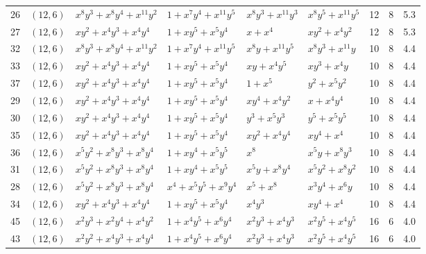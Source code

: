 \begin{table}[t]
\begin{tabular*}{\textwidth}{@{\extracolsep{\fill}}cllllllcc}
26 & $(12,6)$ & $x^{8}y^{3}{+}x^{8}y^{4}{+}x^{11}y^{2}$ & $1{+}x^{7}y^{4}{+}x^{11}y^{5}$ & $x^{8}y^{3}{+}x^{11}y^{3}$ & $x^{8}y^{5}{+}x^{11}y^{5}$ & 12 & 8 & 5.3 \\
27 & $(12,6)$ & $xy^{2}{+}x^{4}y^{3}{+}x^{4}y^{4}$ & $1{+}xy^{5}{+}x^{5}y^{4}$ & $x{+}x^{4}$ & $xy^{2}{+}x^{4}y^{2}$ & 12 & 8 & 5.3 \\
32 & $(12,6)$ & $x^{8}y^{3}{+}x^{8}y^{4}{+}x^{11}y^{2}$ & $1{+}x^{7}y^{4}{+}x^{11}y^{5}$ & $x^{8}y{+}x^{11}y^{5}$ & $x^{8}y^{3}{+}x^{11}y$ & 10 & 8 & 4.4 \\
33 & $(12,6)$ & $xy^{2}{+}x^{4}y^{3}{+}x^{4}y^{4}$ & $1{+}xy^{5}{+}x^{5}y^{4}$ & $xy{+}x^{4}y^{5}$ & $xy^{3}{+}x^{4}y$ & 10 & 8 & 4.4 \\
37 & $(12,6)$ & $xy^{2}{+}x^{4}y^{3}{+}x^{4}y^{4}$ & $1{+}xy^{5}{+}x^{5}y^{4}$ & $1{+}x^{5}$ & $y^{2}{+}x^{5}y^{2}$ & 10 & 8 & 4.4 \\
29 & $(12,6)$ & $xy^{2}{+}x^{4}y^{3}{+}x^{4}y^{4}$ & $1{+}xy^{5}{+}x^{5}y^{4}$ & $xy^{4}{+}x^{4}y^{2}$ & $x{+}x^{4}y^{4}$ & 10 & 8 & 4.4 \\
30 & $(12,6)$ & $xy^{2}{+}x^{4}y^{3}{+}x^{4}y^{4}$ & $1{+}xy^{5}{+}x^{5}y^{4}$ & $y^{3}{+}x^{5}y^{3}$ & $y^{5}{+}x^{5}y^{5}$ & 10 & 8 & 4.4 \\
35 & $(12,6)$ & $xy^{2}{+}x^{4}y^{3}{+}x^{4}y^{4}$ & $1{+}xy^{5}{+}x^{5}y^{4}$ & $xy^{2}{+}x^{4}y^{4}$ & $xy^{4}{+}x^{4}$ & 10 & 8 & 4.4 \\
36 & $(12,6)$ & $x^{5}y^{2}{+}x^{8}y^{3}{+}x^{8}y^{4}$ & $1{+}xy^{4}{+}x^{5}y^{5}$ & $x^{8}$ & $x^{5}y{+}x^{8}y^{3}$ & 10 & 8 & 4.4 \\
31 & $(12,6)$ & $x^{5}y^{2}{+}x^{8}y^{3}{+}x^{8}y^{4}$ & $1{+}xy^{4}{+}x^{5}y^{5}$ & $x^{5}y{+}x^{8}y^{4}$ & $x^{5}y^{2}{+}x^{8}y^{2}$ & 10 & 8 & 4.4 \\
28 & $(12,6)$ & $x^{5}y^{2}{+}x^{8}y^{3}{+}x^{8}y^{4}$ & $x^{4}{+}x^{5}y^{5}{+}x^{9}y^{4}$ & $x^{5}{+}x^{8}$ & $x^{3}y^{4}{+}x^{6}y$ & 10 & 8 & 4.4 \\
34 & $(12,6)$ & $xy^{2}{+}x^{4}y^{3}{+}x^{4}y^{4}$ & $1{+}xy^{5}{+}x^{5}y^{4}$ & $x^{4}y^{3}$ & $xy^{4}{+}x^{4}$ & 10 & 8 & 4.4 \\
45 & $(12,6)$ & $x^{2}y^{3}{+}x^{2}y^{4}{+}x^{4}y^{2}$ & $1{+}x^{4}y^{5}{+}x^{6}y^{4}$ & $x^{2}y^{3}{+}x^{4}y^{3}$ & $x^{2}y^{5}{+}x^{4}y^{5}$ & 16 & 6 & 4.0 \\
43 & $(12,6)$ & $x^{2}y^{2}{+}x^{4}y^{3}{+}x^{4}y^{4}$ & $1{+}x^{4}y^{5}{+}x^{6}y^{4}$ & $x^{2}y^{3}{+}x^{4}y^{3}$ & $x^{2}y^{5}{+}x^{4}y^{5}$ & 16 & 6 & 4.0 \\

\end{tabular*}
\end{table}
